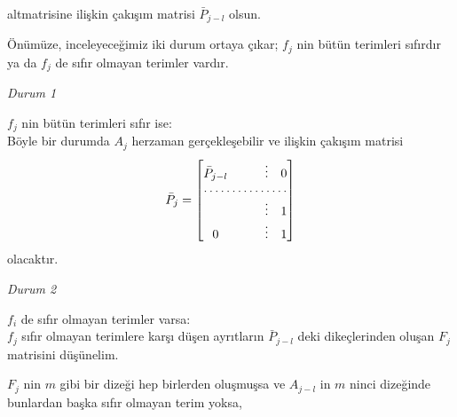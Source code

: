 \documentclass[11pt]{amsbook}
\begin{document}
    altmatrisine ilişkin çakışım matrisi $ \bar P_{j-l} $ olsun.

    Önümüze, inceleyeceğimiz iki durum ortaya çıkar; $ f_{j} $ nin bütün terimleri sıfırdır ya da $ f_{j} $ de sıfır olmayan terimler vardır.
    
    \emph{Durum 1}
    
    $ f_{j} $ nin bütün terimleri sıfır ise: \\
    Böyle bir durumda $ A_{j} $ herzaman gerçekleşebilir ve ilişkin çakışım matrisi
        \[
            \bar P_{j} = 
                \begin{bmatrix}
                    \bar P_{j-l} &  &  & \vdots & 0 \\
                                    \hdotsfor{5} \\
                                 &  &  & \vdots & 1 \\
                               0 &  &  & \vdots & 1 \\
                \end{bmatrix}
        \]
    olacaktır.
    
    \emph{Durum 2}

    $ f_{i} $ de sıfır olmayan terimler varsa: \\
    $ f_{j} $ sıfır olmayan terimlere karşı düşen ayrıtların $ \bar P_{j-l} $ deki dikeçlerinden oluşan $ F_{j} $ matrisini düşünelim.
    \begin{hEnumerateAlpha}
        \item $ F_{j} $ nin $ m $ gibi bir dizeği hep birlerden oluşmuşsa ve $ A_{j-l} $ in $ m $ ninci dizeğinde bunlardan başka sıfır olmayan terim yoksa,
    \end{hEnumerateAlpha}
\end{document}
